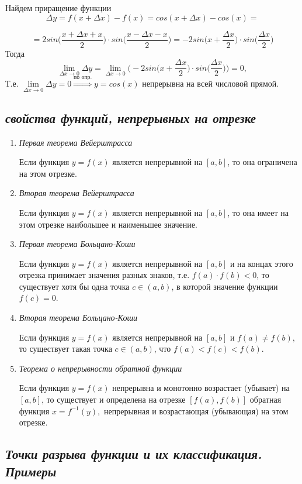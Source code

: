 Найдем приращение функции $$\Delta y = f(x + \Delta x) - f(x) = cos(x + \Delta x) - cos(x) =$$

$$=2sin{\Big(}\frac{x + \Delta x + x}{2}{\Big)}\cdot sin\Big(\frac{x - \Delta x - x}{2}{\Big)} = -2sin\Big(x + \frac{ \Delta x }{2}{\Big)}\cdot sin{\Big(}\frac{\Delta x}{2}{\Big)} $$ Тогда $$\lim\limits_{\Delta x \to 0}\Delta y = \lim\limits_{\Delta x \to 0}\Bigg(-2sin\Big(x + \frac{ \Delta x }{2}{\Big)}\cdot sin{\Big(}\frac{\Delta x}{2}{\Big)}\Bigg) = 0, $$ Т.е. $\lim\limits_{\Delta x \to 0}\Delta y = 0 \overset{\text{по опр.}}\Rightarrow y = cos(x)$ непрерывна на всей числовой прямой.
\newpage 
\subsection{\textit{свойства функций, непрерывных на отрезке}}
\begin{enumerate}

\item \textit{Первая теорема Вейерштрасса}

Если функция $y = f(x)$ является непрерывной на $[a, b]$, то она ограничена на этом отрезке.
\item \textit{Вторая теорема Вейерштрасса}

Если функция $y = f(x)$ является непрерывной на $[a, b]$, то она имеет на этом отрезке наибольшее и наименьшее значение. %
\item \textit{Первая теорема Больцано-Коши}

Если функция $y = f(x)$ является непрерывной на $[a, b]$ и на концах этого отрезка принимает значения разных знаков, т.е. $f(a)\cdot f(b) < 0$, то существует хотя бы одна точка $c \in (a, b)$, в которой значение функции $f(c) = 0$.
\item \textit{Вторая теорема Больцано-Коши}

Если функция $y = f(x)$ является непрерывной на $[a, b]$ и $f(a)\neq f(b)$, то существует такая точка $c \in (a, b)$, что $f(a) < f(c) < f(b)$.
\item \textit{Теорема о непрерывности обратной функции}

Если функция $y = f(x)$ непрерывна и монотонно возрастает (убывает) на $[a, b]$, то существует и определена на отрезке $[f(a), f(b)]$ обратная функция $x = f^{-1}(y),$ непрерывная и возрастающая (убывающая) на этом отрезке.

\end{enumerate}
\newpage 
\subsection{\textit{Точки разрыва функции и их классификация. Примеры}}

